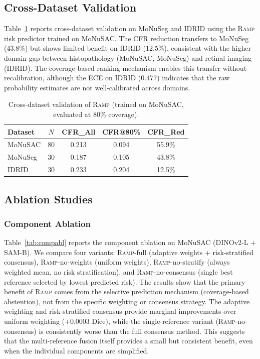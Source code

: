 \documentclass[11pt]{article}
\newcommand{\RAMP}{\textsc{Ramp}}
\begin{document}
\subsection{Cross-Dataset Validation}

Table~\ref{tab:cross} reports cross-dataset validation on MoNuSeg and IDRID
using the \RAMP{} risk predictor trained on MoNuSAC. The CFR reduction
transfers to MoNuSeg (43.8\%) but shows limited benefit on IDRID (12.5\%),
consistent with the higher domain gap between histopathology (MoNuSAC,
MoNuSeg) and retinal imaging (IDRID). The coverage-based ranking mechanism
enables this transfer without recalibration, although the ECE on IDRID
(0.477) indicates that the raw probability estimates are not well-calibrated
across domains.

\begin{table}[t]
\centering
\caption{Cross-dataset validation of \RAMP{} (trained on MoNuSAC,
  evaluated at 80\% coverage).}
\label{tab:cross}
\begin{tabular}{lcccc}
\toprule
Dataset & $N$ & CFR\_All & CFR@80\% & CFR\_Red \\
\midrule
MoNuSAC & 80 & 0.213 & 0.094 & 55.9\% \\
MoNuSeg & 30 & 0.187 & 0.105 & 43.8\% \\
IDRID   & 30 & 0.233 & 0.204 & 12.5\% \\
\bottomrule
\end{tabular}
\end{table}

\subsection{Ablation Studies}

\subsubsection{Component Ablation}

Table~\ref{tab:compabl} reports the component ablation on MoNuSAC
(DINOv2-L + SAM-B). We compare four variants: \RAMP{}-full (adaptive
weights + risk-stratified consensus), \RAMP{}-no-weights (uniform weights),
\RAMP{}-no-stratify (always weighted mean, no risk stratification), and
\RAMP{}-no-consensus (single best reference selected by lowest predicted
risk). The results show that the primary benefit of \RAMP{} comes from the
selective prediction mechanism (coverage-based abstention), not from the
specific weighting or consensus strategy. The adaptive weighting and
risk-stratified consensus provide marginal improvements over uniform
weighting ($+0.0003$ Dice), while the single-reference variant
(\RAMP{}-no-consensus) is consistently worse than the full consensus method.
This suggests that the multi-reference fusion itself provides a small but
consistent benefit, even when the individual components are simplified.
\end{document}

